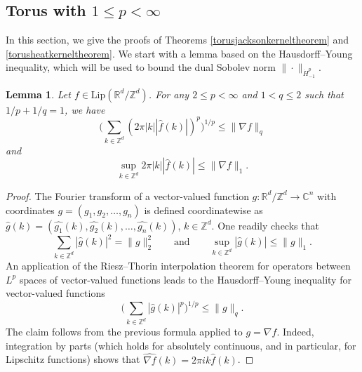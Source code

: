 \documentclass[11pt,a4paper]{article}
\newtheorem{lem}[thm]{Lemma}
\theoremstyle{definition}
\begin{document}
\subsection{Torus with $1 \le p < \infty$}

In this section, we give the proofs of Theorems \ref{torusjacksonkerneltheorem} and \ref{torusheatkerneltheorem}. We start with a lemma based on the Hausdorff--Young inequality, which will be used to bound the dual Sobolev norm $\| \cdot \|_{\dot{H}_{-1}^p}$.
\begin{lem}\label{torushausdorffyounglemma} Let $f \in \mathrm{Lip}(\mathbb{R}^d / \mathbb{Z}^d)$. For any $2 \le p < \infty$ and $1 < q \le 2$ such that $1/p+1/q=1$, we have
\[ \Bigg( \sum_{k \in \mathbb{Z}^d} (2 \pi |k| |\widehat{f}(k)|)^p \Bigg)^{1/p} \le \| \nabla f \|_q \]
and
\[ \sup_{k \in \mathbb{Z}^d} 2 \pi |k| |\widehat{f}(k)| \le \| \nabla f \|_1 . \]
\end{lem}

\begin{proof} The Fourier transform of a vector-valued function $g: \mathbb{R}^d / \mathbb{Z}^d \to \mathbb{C}^n$ with coordinates $g=(g_1, g_2, \ldots, g_n)$ is defined coordinatewise as $\widehat{g}(k)=(\widehat{g_1}(k), \widehat{g_2}(k), \ldots, \widehat{g_n}(k))$, $k \in \mathbb{Z}^d$. One readily checks that
\[ \sum_{k \in \mathbb{Z}^d} |\widehat{g}(k)|^2 = \| g \|_2^2 \qquad \textrm{and} \qquad \sup_{k \in \mathbb{Z}^d} |\widehat{g}(k)| \le \| g \|_1 . \]
An application of the Riesz--Thorin interpolation theorem for operators between $L^p$ spaces of vector-valued functions \cite[p.\ 83]{HNVW} leads to the Hausdorff--Young inequality for vector-valued functions
\[ \Bigg( \sum_{k \in \mathbb{Z}^d} |\widehat{g}(k)|^p \Bigg)^{1/p} \le \| g \|_q . \]
The claim follows from the previous formula applied to $g=\nabla f$. Indeed, integration by parts (which holds for absolutely continuous, and in particular, for Lipschitz functions) shows that $\widehat{\nabla f}(k)=2 \pi i k \widehat{f}(k)$.
\end{proof}
\end{document}
